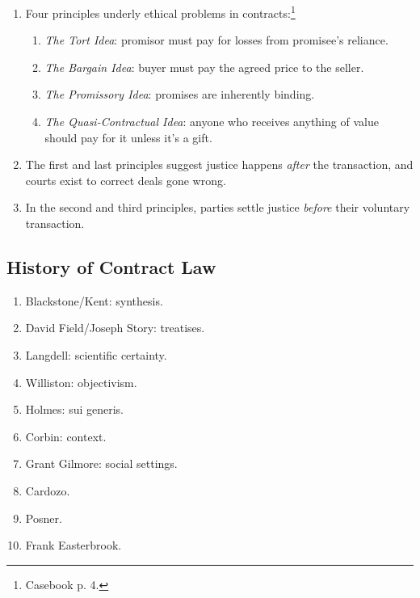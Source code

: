 \begin{enumerate}
    \item Four principles underly ethical problems in 
    contracts:\footnote{Casebook p. 4.}
    \begin{enumerate}
        \item \emph{The Tort Idea}: promisor must pay for losses from 
        promisee's reliance.
        \item \emph{The Bargain Idea}: buyer must pay the agreed price to the 
        seller.
        \item \emph{The Promissory Idea}: promises are inherently binding.
        \item \emph{The Quasi-Contractual Idea}: anyone who receives anything 
        of value should pay for it unless it's a gift.
    \end{enumerate}
    \item The first and last principles suggest justice happens \emph{after} 
    the transaction, and courts exist to correct deals gone wrong.
    \item In the second and third principles, parties settle justice 
    \emph{before} their voluntary transaction.
\end{enumerate}

\subsection{History of Contract Law}

\begin{enumerate}
    \item Blackstone/Kent: synthesis.
    \item David Field/Joseph Story: treatises.
    \item Langdell: scientific certainty.
    \item Williston: objectivism.
    \item Holmes: sui generis.
    \item Corbin: context.
    \item Grant Gilmore: social settings.
    \item Cardozo.
    \item Posner.
    \item Frank Easterbrook.
\end{enumerate}

